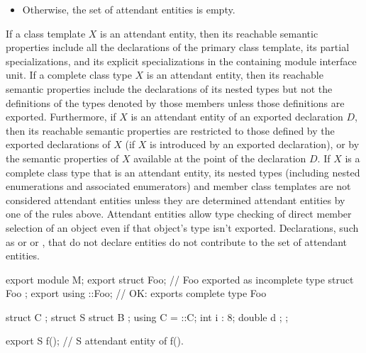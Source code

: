 \begin{std.txt}
\begin{before}
\begin{itemize}
    \item\color{addclr} Otherwise, the set of attendant entities is empty.
  \end{itemize}
\end{before}\begin{before}\color{addclr}
  If a class template $X$ is an attendant entity, then its reachable semantic
  properties include all the declarations of the primary class template,
  its partial specializations, and its explicit specializations in the
  containing module interface unit.
  If a complete class type $X$ is an attendant entity, then its reachable
  semantic properties include the declarations of its nested types but
  not the definitions of the types denoted by those members
   unless those definitions are exported.
  Furthermore, if $X$ is an attendant entity of an 
  exported declaration $D$, then its reachable semantic properties are 
  restricted to those defined by the exported declarations of $X$ 
  (if $X$ is introduced by an exported declaration), or by 
  the semantic properties of $X$ available at the point of the declaration $D$.
  \enternote
  If $X$ is a complete class type that is an attendant entity, its nested types
  (including nested enumerations and associated enumerators) 
  and member class templates
  are not considered attendant entities unless they are determined attendant
  entities by one of the rules above.  Attendant entities allow type checking 
  of direct member selection of an object even if that object's type isn't exported.
  Declarations, such as  or
   or 
  ,
   that do not declare entities do not contribute to the set of attendant entities.
  \exitnote
  \begin{example}
    \begin{codeblock}
      export module M;
      export struct Foo;          // Foo exported as incomplete type
      struct Foo { };
      export using ::Foo;         // OK: exports complete type Foo

      struct C { };
      struct S {
        struct B { };
        using C = ::C;
        int i : 8;
        double d { };
      };

      export S f();       // S attendant entity of f().


\end{codeblock}
\end{example}
\end{before}
\end{std.txt}
